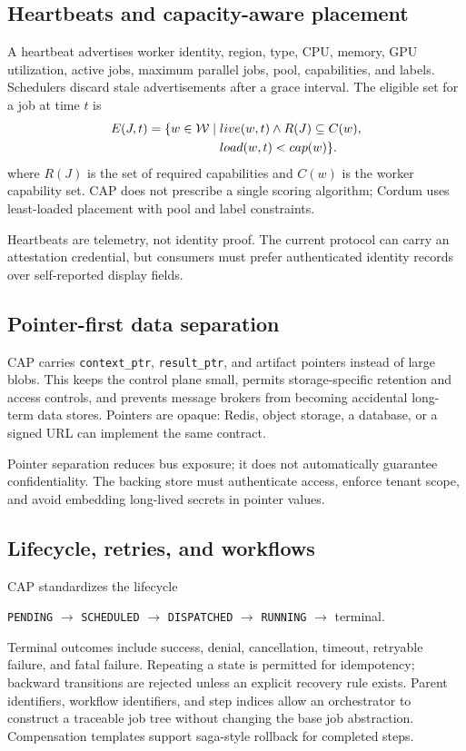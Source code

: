 \subsection{Heartbeats and capacity-aware placement}

A heartbeat advertises worker identity, region, type, CPU, memory, GPU utilization, active jobs, maximum parallel jobs, pool, capabilities, and labels. Schedulers discard stale advertisements after a grace interval. The eligible set for a job at time $t$ is
\begin{equation}
\begin{aligned}
E(J,t) = \{w \in \mathcal{W} \mid{}& live(w,t) \land R(J) \subseteq C(w),\\
& load(w,t) < cap(w)\}.
\end{aligned}
\end{equation}
where $R(J)$ is the set of required capabilities and $C(w)$ is the worker capability set. CAP does not prescribe a single scoring algorithm; Cordum uses least-loaded placement with pool and label constraints.

Heartbeats are telemetry, not identity proof. The current protocol can carry an attestation credential, but consumers must prefer authenticated identity records over self-reported display fields.

\subsection{Pointer-first data separation}

CAP carries \texttt{context\_ptr}, \texttt{result\_ptr}, and artifact pointers instead of large blobs. This keeps the control plane small, permits storage-specific retention and access controls, and prevents message brokers from becoming accidental long-term data stores. Pointers are opaque: Redis, object storage, a database, or a signed URL can implement the same contract.

Pointer separation reduces bus exposure; it does not automatically guarantee confidentiality. The backing store must authenticate access, enforce tenant scope, and avoid embedding long-lived secrets in pointer values.

\subsection{Lifecycle, retries, and workflows}

CAP standardizes the lifecycle
\begin{center}
\small
\texttt{PENDING} $\rightarrow$ \texttt{SCHEDULED} $\rightarrow$ \texttt{DISPATCHED} $\rightarrow$ \texttt{RUNNING} $\rightarrow$ terminal.
\end{center}
Terminal outcomes include success, denial, cancellation, timeout, retryable failure, and fatal failure. Repeating a state is permitted for idempotency; backward transitions are rejected unless an explicit recovery rule exists. Parent identifiers, workflow identifiers, and step indices allow an orchestrator to construct a traceable job tree without changing the base job abstraction. Compensation templates support saga-style rollback for completed steps.

